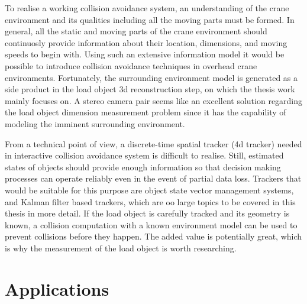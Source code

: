 \documentclass[12pt,a4paper,oneside,pdftex]{report}
\begin{document}
To realise a working collision avoidance system, an understanding of the crane environment and its qualities including all the moving parts must be formed. In general, all the static and moving parts of the crane environment should continuosly provide information about their location, dimensions, and moving speeds to begin with. Using such an extensive information model it would be possible to introduce collision avoidance techniques in overhead crane environments. Fortunately, the surrounding environment model is generated as a side product in the load object 3d reconstruction step, on which the thesis work mainly focuses on. A stereo camera pair seems like an excellent solution regarding the load object dimension measurement problem since it has the capability of modeling the imminent surrounding environment.

From a technical point of view, a discrete-time spatial tracker (4d tracker) needed in interactive collision avoidance system is difficult to realise. Still, estimated states of objects should provide enough information so that decision making processes can operate reliably even in the event of partial data loss. Trackers that would be suitable for this purpose are object state vector management systems, and Kalman filter based trackers, which are oo large topics to be covered in this thesis in more detail. If the load object is carefully tracked and its geometry is known, a collision computation with a known environment model can be used to prevent collisions before they happen. The added value is potentially great, which is why the measurement of the load object is worth researching. \citep{Leibe07, Corke11, Miller12}


\section{Applications}
\end{document}
